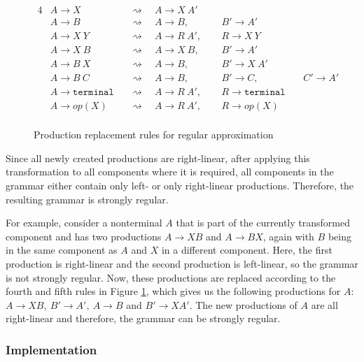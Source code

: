 \begin{figure}[!h]
	\begin{alignat*}{4}
		& A \rightarrow X 	 && \rightsquigarrow \quad A \rightarrow X\ A'\ \  & &\\
		& A \rightarrow B 	 && \rightsquigarrow \quad A \rightarrow B,\ \ 	   & &B' \rightarrow A'\ &&\\
		& A \rightarrow X\ Y && \rightsquigarrow \quad A \rightarrow R\ A',\ \ & &R  \rightarrow X\ Y\ &&\\
		& A \rightarrow X\ B && \rightsquigarrow \quad A \rightarrow X\ B,\ \  & &B' \rightarrow A'\ &&\\
		& A \rightarrow B\ X && \rightsquigarrow \quad A \rightarrow B,\ \ 	   & &B' \rightarrow X\ A'\ &&\\
		& A \rightarrow B\ C && \rightsquigarrow \quad A \rightarrow B,\ \     & &B' \rightarrow C,\ &&C' \rightarrow A'\\
		& A \rightarrow \texttt{terminal} && \rightsquigarrow \quad A \rightarrow R\ A',\ \ & &R \rightarrow \texttt{terminal}\ &&\\
		& A \rightarrow op(X) && \rightsquigarrow  \quad A \rightarrow R\ A',\ \ & &R \rightarrow op(X)\ &&\\
	\end{alignat*}
\caption{Production replacement rules for regular approximation}
\label{fig:approx:prodreplacement}
\end{figure}
Since all newly created productions are right-linear, after applying this transformation to all components where it is required, all components in the grammar either contain only left- or only right-linear productions. Therefore, the resulting grammar is strongly regular.

For example, consider a nonterminal $A$ that is part of the currently transformed component and has two productions $A \rightarrow X B$ and $A \rightarrow B X$, again with $B$ being in the same component as $A$ and $X$ in a different component. Here, the first production is right-linear and the second production is left-linear, so the grammar is not strongly regular.
Now, these productions are replaced according to the fourth and fifth rules in Figure \ref{fig:approx:prodreplacement}, which gives us the following productions for $A$: $A \rightarrow XB,\ B' \rightarrow A',\ A \rightarrow B$ and $B' \rightarrow X A'$.
The new productions of $A$ are all right-linear and therefore, the grammar can be strongly regular.

\newpage
\subsubsection{Implementation}

